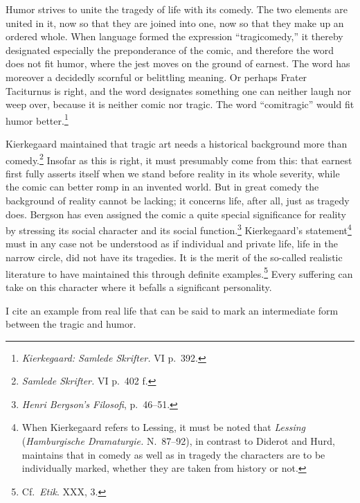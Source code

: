 \documentclass[12pt]{book}
\newcommand{\opage}[1]{\marginnote{\footnotesize\textit{[#1]}}}
\begin{document}
Humor strives to unite the tragedy of life with its comedy. The two elements are united
in it, now so that they are joined into one, now so that they make up an ordered whole.
When language formed the expression ``tragicomedy,'' it thereby designated especially
the preponderance of the comic, and therefore the word does not fit humor, where the
jest moves on the ground of earnest. The word has moreover a decidedly scornful or
belittling meaning. Or perhaps Frater Taciturnus is right, and the word designates
something one can neither laugh nor weep over, because it is neither comic nor tragic.
The word ``comitragic'' would fit humor better.\footnote{\textit{Kierkegaard: Samlede
Skrifter.} VI p.~392.}

Kierkegaard maintained that tragic art needs a historical background more than
comedy.\footnote{\textit{Samlede Skrifter.} VI p.~402 f.} Insofar as this is right,
it must presumably come from this: that earnest first fully asserts itself when we
stand before reality in its whole severity, while the comic can better romp in an
invented world. But in great comedy the background of reality cannot be lacking; it
concerns life, after all, just as tragedy does. Bergson has even assigned the comic a
quite special significance for reality by stressing its social character and its
social function.\footnote{\textit{Henri Bergson's Filosofi}, p.~46--51.} Kierkegaard's
statement\footnote{When Kierkegaard refers to Lessing, it must be noted that
\textit{Lessing} (\textit{Hamburgische Dramaturgie.} N.~87--92), in contrast to
Diderot and Hurd, maintains that in comedy as well as in tragedy the characters are to
be individually marked, whether they are taken from history or not.} must in any case
not be understood as if individual and private life, life in the narrow circle, did not
\opage{90}have its tragedies. It is the merit of the so-called realistic literature to
have maintained this through definite examples.\footnote{Cf.\ \textit{Etik}. XXX, 3.}
Every suffering can take on this character where it befalls a significant personality.

I cite an example from real life that can be said to mark an intermediate form between
the tragic and humor.
\end{document}

